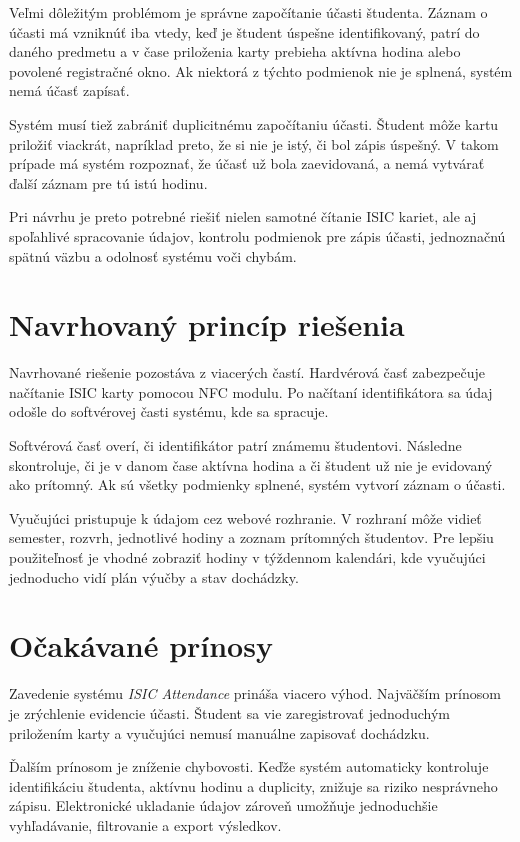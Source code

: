 Veľmi dôležitým problémom je správne započítanie účasti študenta. Záznam o účasti má vzniknúť iba vtedy, keď je študent úspešne identifikovaný, patrí do daného predmetu a v čase priloženia karty prebieha aktívna hodina alebo povolené registračné okno. Ak niektorá z týchto podmienok nie je splnená, systém nemá účasť zapísať.

Systém musí tiež zabrániť duplicitnému započítaniu účasti. Študent môže kartu priložiť viackrát, napríklad preto, že si nie je istý, či bol zápis úspešný. V takom prípade má systém rozpoznať, že účasť už bola zaevidovaná, a nemá vytvárať ďalší záznam pre tú istú hodinu.

Pri návrhu je preto potrebné riešiť nielen samotné čítanie ISIC kariet, ale aj spoľahlivé spracovanie údajov, kontrolu podmienok pre zápis účasti, jednoznačnú spätnú väzbu a odolnosť systému voči chybám.
\section{Navrhovaný princíp riešenia}
\label{sec:proposed-solution-principle}

Navrhované riešenie pozostáva z viacerých častí. Hardvérová časť zabezpečuje načítanie ISIC karty pomocou NFC modulu. Po načítaní identifikátora sa údaj odošle do softvérovej časti systému, kde sa spracuje.

Softvérová časť overí, či identifikátor patrí známemu študentovi. Následne skontroluje, či je v danom čase aktívna hodina a či študent už nie je evidovaný ako prítomný. Ak sú všetky podmienky splnené, systém vytvorí záznam o účasti.

Vyučujúci pristupuje k údajom cez webové rozhranie. V rozhraní môže vidieť semester, rozvrh, jednotlivé hodiny a zoznam prítomných študentov. Pre lepšiu použiteľnosť je vhodné zobraziť hodiny v týždennom kalendári, kde vyučujúci jednoducho vidí plán výučby a stav dochádzky.

\section{Očakávané prínosy}
\label{sec:expected-benefits}

Zavedenie systému \textit{ISIC Attendance} prináša viacero výhod. Najväčším prínosom je zrýchlenie evidencie účasti. Študent sa vie zaregistrovať jednoduchým priložením karty a vyučujúci nemusí manuálne zapisovať dochádzku.

Ďalším prínosom je zníženie chybovosti. Keďže systém automaticky kontroluje identifikáciu študenta, aktívnu hodinu a duplicity, znižuje sa riziko nesprávneho zápisu. Elektronické ukladanie údajov zároveň umožňuje jednoduchšie vyhľadávanie, filtrovanie a export výsledkov.

